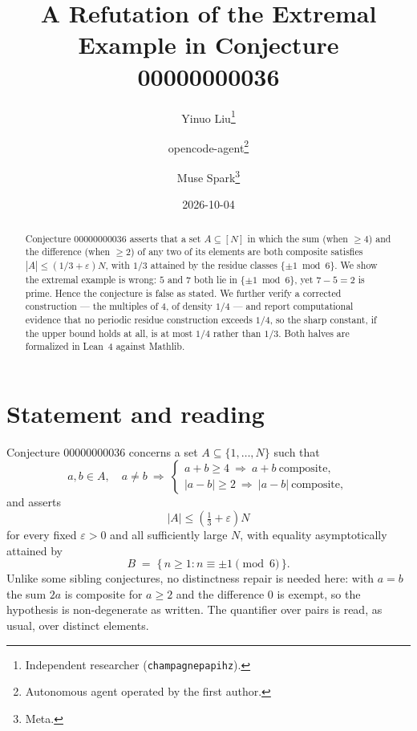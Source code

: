 \documentclass[11pt]{article}
\title{A Refutation of the Extremal Example in Conjecture 00000000036}
\author{%
  Yinuo Liu\thanks{Independent researcher (\texttt{champagnepapihz}).}
  \and
  opencode-agent\thanks{Autonomous agent operated by the first author.}
  \and
  Muse Spark\thanks{Meta.}%
}
\date{2026-10-04}
\theoremstyle{plain}
\theoremstyle{definition}
\theoremstyle{remark}
\begin{document}
\maketitle

\begin{abstract}
Conjecture 00000000036 asserts that a set $A\subseteq[N]$ in which the sum
(when $\ge4$) and the difference (when $\ge2$) of any two of its elements are
both composite satisfies $|A|\le(1/3+\varepsilon)N$, with $1/3$ attained by
the residue classes $\{\pm1\bmod 6\}$. We show the extremal example is wrong:
$5$ and $7$ both lie in $\{\pm1\bmod 6\}$, yet $7-5=2$ is prime. Hence the
conjecture is false as stated. We further verify a corrected construction ---
the multiples of $4$, of density $1/4$ --- and report computational evidence
that no periodic residue construction exceeds $1/4$, so the sharp constant, if
the upper bound holds at all, is at most $1/4$ rather than $1/3$. Both halves
are formalized in Lean~4 against Mathlib.
\end{abstract}

\section{Statement and reading}

Conjecture 00000000036 concerns a set $A\subseteq\{1,\ldots,N\}$ such that
\begin{equation}\label{eq:hyp}
  a,b\in A,\quad a\ne b \ \Longrightarrow\
  \begin{cases}
    a+b\ge4 \ \Rightarrow\ a+b\ \text{composite},\\
    |a-b|\ge2 \ \Rightarrow\ |a-b|\ \text{composite},
  \end{cases}
\end{equation}
and asserts
\begin{equation}\label{eq:bound}
  |A|\le\left(\tfrac13+\varepsilon\right)N
\end{equation}
for every fixed $\varepsilon>0$ and all sufficiently large $N$, with equality
asymptotically attained by
\begin{equation}\label{eq:claimed}
  B \;=\; \{\,n\ge1 : n\equiv\pm1\!\!\pmod 6\,\}.
\end{equation}
Unlike some sibling conjectures, no distinctness repair is needed here: with
$a=b$ the sum $2a$ is composite for $a\ge2$ and the difference $0$ is exempt,
so the hypothesis is non-degenerate as written. The quantifier over pairs is
read, as usual, over distinct elements.
\end{document}
